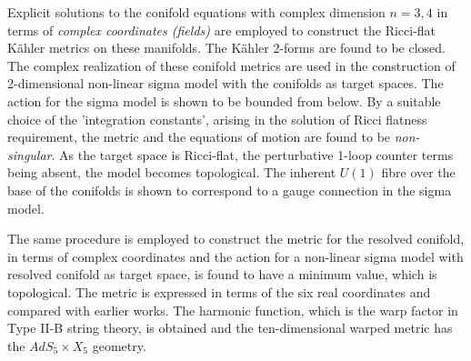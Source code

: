 \documentclass[a4paper,12pt]{article}
\begin{document}
{

\vspace{0.5cm}

Explicit solutions to the conifold equations with complex dimension $n=3,4$ 
in terms of {\it{complex coordinates (fields)}} are employed to construct 
the Ricci-flat K\"{a}hler metrics on these manifolds. The K\"{a}hler 
2-forms are found to be closed. The complex realization of these conifold 
metrics are used in the construction of 2-dimensional non-linear sigma model 
with the conifolds as target spaces. The action for the sigma model is shown 
to be bounded from below. By a suitable choice of the 'integration constants', 
arising in the solution of Ricci flatness requirement, the metric and the 
equations of motion are found to be {\it{non-singular}}. 
As the target space is Ricci-flat,
the perturbative 1-loop counter terms being absent, the model becomes 
topological. The inherent $U(1)$ fibre over the base of the conifolds is shown 
to correspond to a gauge connection in the sigma model.  

The same procedure is employed to construct the metric for the resolved 
conifold, in terms of complex coordinates and the action for a non-linear 
sigma model with resolved conifold as target space, is found to have a 
minimum value, which is topological. The metric is expressed in terms of the 
six real coordinates and compared with earlier works. The harmonic function,
which is the warp factor in Type II-B string theory, is obtained and the 
ten-dimensional warped metric has the $AdS_5 \times X_5$ geometry. 

\newpage 	
{}

\vspace{0.5cm}

}
\end{document}
